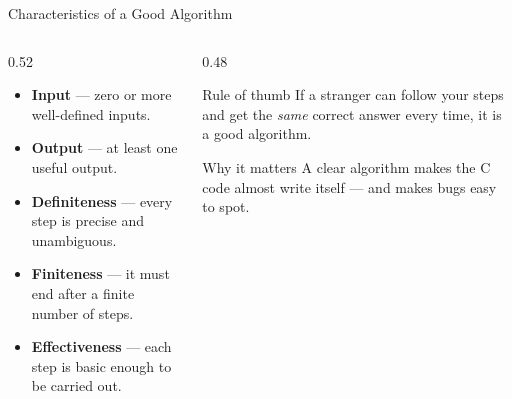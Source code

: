 \documentclass[aspectratio=169]{beamer}
\begin{document}
	\begin{frame}{Characteristics of a Good Algorithm}
		\begin{columns}[T]
			\begin{column}{0.52\textwidth}
				\begin{itemize}
					\item \textbf{Input} --- zero or more well-defined inputs.
					\item \textbf{Output} --- at least one useful output.
					\item \textbf{Definiteness} --- every step is precise and unambiguous.
					\item \textbf{Finiteness} --- it must end after a finite number of steps.
					\item \textbf{Effectiveness} --- each step is basic enough to be carried out.
				\end{itemize}
			\end{column}
			\begin{column}{0.48\textwidth}
				\begin{block}{Rule of thumb}
					\small If a stranger can follow your steps and get the \emph{same} correct answer every time, it is a good algorithm.
				\end{block}
				\begin{block}{Why it matters}
					\small A clear algorithm makes the C code almost write itself --- and makes bugs easy to spot.
				\end{block}
			\end{column}
		\end{columns}
	\end{frame}
	
\end{document}
